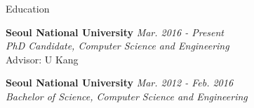 \documentclass{resume} %
\begin{document}

\begin{rSection}{Education}

\textbf{Seoul National University} \hfill \emph{Mar. 2016 - Present} \\ 
\emph{PhD Candidate, Computer Science and Engineering} \\
Advisor: U Kang

\textbf{Seoul National University} \hfill \emph{Mar. 2012 - Feb. 2016} \\ 
\emph{Bachelor of Science, Computer Science and Engineering}

\end{rSection}

\end{document}
